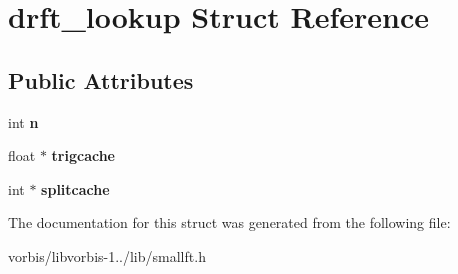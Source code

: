 \hypertarget{structdrft__lookup}{\section{drft\+\_\+lookup Struct Reference}
\label{structdrft__lookup}
}
\subsection*{Public Attributes}
\begin{DoxyCompactItemize}
\item 
\hypertarget{structdrft__lookup_a47683cf492a91fbd3381eee48efa389c}{int {\bfseries n}}\label{structdrft__lookup_a47683cf492a91fbd3381eee48efa389c}

\item 
\hypertarget{structdrft__lookup_abadb842ed4e0b1b90b0d621acdf0ea4c}{float $\ast$ {\bfseries trigcache}}\label{structdrft__lookup_abadb842ed4e0b1b90b0d621acdf0ea4c}

\item 
\hypertarget{structdrft__lookup_ad0e2018119f00417ea11756c1f78fd7a}{int $\ast$ {\bfseries splitcache}}\label{structdrft__lookup_ad0e2018119f00417ea11756c1f78fd7a}

\end{DoxyCompactItemize}


The documentation for this struct was generated from the following file\+:\begin{DoxyCompactItemize}
\item 
vorbis/libvorbis-\/1../lib/smallft.\+h\end{DoxyCompactItemize}
